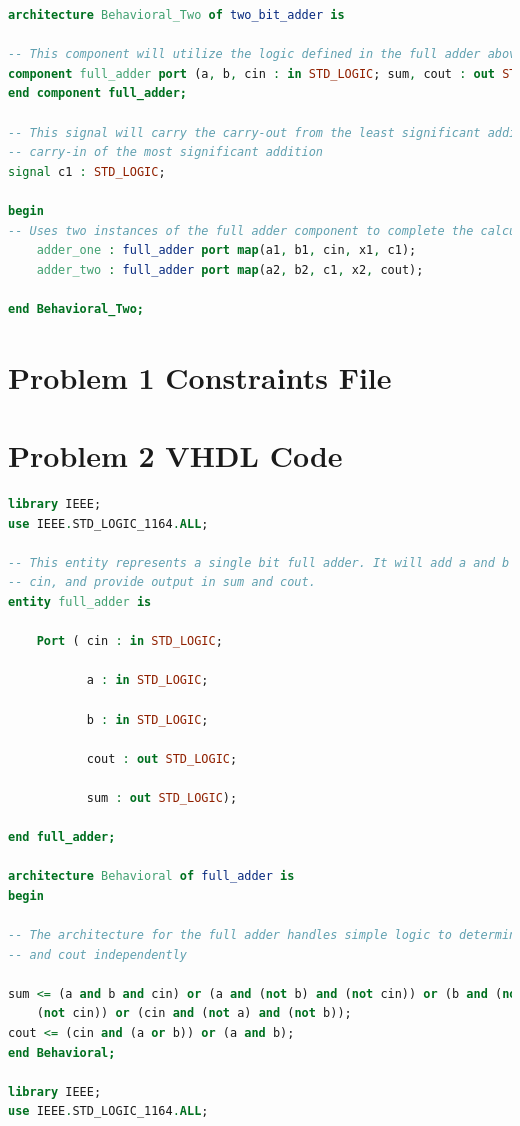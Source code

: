 \documentclass[11pt]{article}
\begin{document}
\begin{appendices}
\begin{lstlisting}[language=VHDL]
architecture Behavioral_Two of two_bit_adder is

-- This component will utilize the logic defined in the full adder above
component full_adder port (a, b, cin : in STD_LOGIC; sum, cout : out STD_LOGIC);
end component full_adder;

-- This signal will carry the carry-out from the least significant addition to the 
-- carry-in of the most significant addition
signal c1 : STD_LOGIC;

begin
-- Uses two instances of the full adder component to complete the calculation
    adder_one : full_adder port map(a1, b1, cin, x1, c1);
    adder_two : full_adder port map(a2, b2, c1, x2, cout);

end Behavioral_Two;

\end{lstlisting}

\section{Problem 1 Constraints File}

\section{Problem 2 VHDL Code}
\begin{lstlisting}[language=VHDL]
library IEEE;
use IEEE.STD_LOGIC_1164.ALL;

-- This entity represents a single bit full adder. It will add a and b along with 
-- cin, and provide output in sum and cout.
entity full_adder is

    Port ( cin : in STD_LOGIC;

           a : in STD_LOGIC;

           b : in STD_LOGIC;

           cout : out STD_LOGIC;

           sum : out STD_LOGIC);

end full_adder;

architecture Behavioral of full_adder is
begin

-- The architecture for the full adder handles simple logic to determine sum 
-- and cout independently

sum <= (a and b and cin) or (a and (not b) and (not cin)) or (b and (not a) and 
	(not cin)) or (cin and (not a) and (not b));
cout <= (cin and (a or b)) or (a and b);
end Behavioral;

library IEEE;
use IEEE.STD_LOGIC_1164.ALL;


\end{lstlisting}
\end{appendices}
\end{document}
